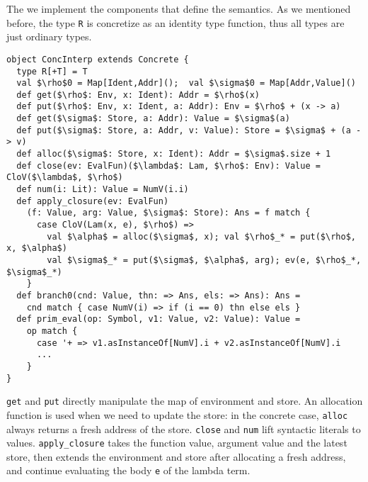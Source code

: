 The we implement the components that define the semantics. 
As we mentioned before, the type \texttt{R} is concretize as an identity type function, thus
all types are just ordinary types.

\begin{lstlisting}
object ConcInterp extends Concrete {
  type R[+T] = T
  val $\rho$0 = Map[Ident,Addr]();  val $\sigma$0 = Map[Addr,Value]()
  def get($\rho$: Env, x: Ident): Addr = $\rho$(x)
  def put($\rho$: Env, x: Ident, a: Addr): Env = $\rho$ + (x -> a)
  def get($\sigma$: Store, a: Addr): Value = $\sigma$(a)
  def put($\sigma$: Store, a: Addr, v: Value): Store = $\sigma$ + (a -> v)
  def alloc($\sigma$: Store, x: Ident): Addr = $\sigma$.size + 1
  def close(ev: EvalFun)($\lambda$: Lam, $\rho$: Env): Value = CloV($\lambda$, $\rho$)
  def num(i: Lit): Value = NumV(i.i)
  def apply_closure(ev: EvalFun)
    (f: Value, arg: Value, $\sigma$: Store): Ans = f match {
      case CloV(Lam(x, e), $\rho$) =>
        val $\alpha$ = alloc($\sigma$, x); val $\rho$_* = put($\rho$, x, $\alpha$)
        val $\sigma$_* = put($\sigma$, $\alpha$, arg); ev(e, $\rho$_*, $\sigma$_*)
    }
  def branch0(cnd: Value, thn: => Ans, els: => Ans): Ans = 
    cnd match { case NumV(i) => if (i == 0) thn else els }
  def prim_eval(op: Symbol, v1: Value, v2: Value): Value = 
    op match {
      case '+ => v1.asInstanceOf[NumV].i + v2.asInstanceOf[NumV].i
      ...
    }
}
\end{lstlisting}

\texttt{get} and \texttt{put} directly manipulate the map of environment and store. 
An allocation function is used when we need to update the store: 
in the concrete case, \texttt{alloc} always returns a fresh address of the store.
\texttt{close} and \texttt{num} lift syntactic literals to values.
\texttt{apply\_closure} takes the function value, argument value and the latest store,
then extends the environment and store after allocating a fresh address, and continue
evaluating the body \texttt{e} of the lambda term.
